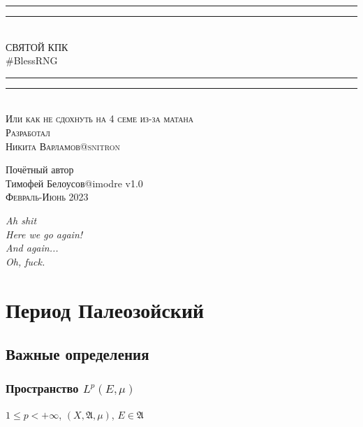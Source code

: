 \documentclass{article}
\begin{document}
\begin{titlepage}
    \centering
    \vspace*{\baselineskip}
    \rule{\textwidth}{1.6pt}\vspace*{-\baselineskip}\vspace*{2pt}
    \rule{\textwidth}{0.4pt}\\[\baselineskip]
    {\LARGE СВЯТОЙ КПК\\ [0.3\baselineskip] \#BlessRNG}\\[0.2\baselineskip]
    \rule{\textwidth}{0.4pt}\vspace*{-\baselineskip}\vspace{3.2pt}
    \rule{\textwidth}{1.6pt}\\[\baselineskip]
    \scshape
    Или как не сдохнуть на 4 семе из-за матана \\
    \vspace*{2\baselineskip}
    Разработал \\[\baselineskip]
    {\Large Никита Варламов\quad @snitron}
        \vspace*{2\baselineskip}\par
    Почётный автор \\[\baselineskip]
    {\Large Тимофей Белоусов\quad @imodre}
    \vfill
    v1.0\\
    {\scshape Февраль-Июнь 2023} \par
\end{titlepage}

\begin{flushright}
\emph{Ah shit\\
Here we go again!\\
And again...\\
Oh, fuck.}
\end{flushright}


\tableofcontents


\setlength{\parskip}{6pt}%
\newpage
{}


\section{Период Палеозойский}
\subsection{Важные определения}

\subsubsection{Пространство $L^p(E,\mu)$}
$1 \le p < +\infty$, $(X, \mathfrak{A}, \mu)$, $E \in \mathfrak{A}$
\end{document}
